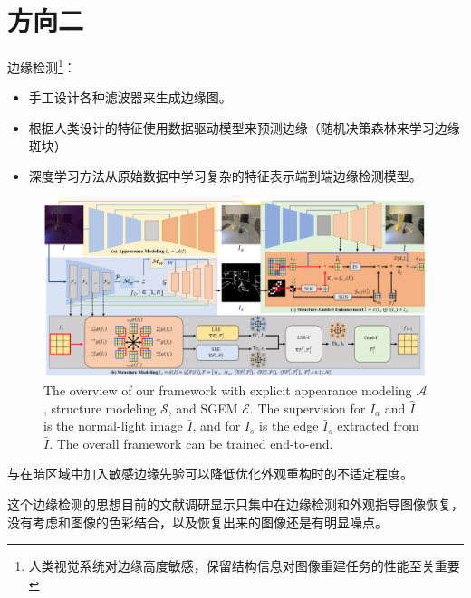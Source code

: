\documentclass[letterpaper,10pt]{article}
\begin{document}
	\section{方向二}
	
		边缘检测\footnote{人类视觉系统对边缘高度敏感，保留结构信息对图像重建任务的性能至关重要}：
		
		\begin{itemize}
			\item[(1)] 
			手工设计各种滤波器来生成边缘图。
			
			\item[(2)]
			根据人类设计的特征使用数据驱动模型来预测边缘（随机决策森林来学习边缘斑块）
			
			\item[(3)]
			深度学习方法从原始数据中学习复杂的特征表示端到端边缘检测模型。
		\end{itemize}	
	
		\begin{figure}[htbp]
			\centering 
			\includegraphics[width=\columnwidth]{picture/LLIE/Overview}
			\caption{
				\label{fig: Overview} 
				The overview of our framework with explicit appearance modeling $\mathcal{A}$, structure modeling $\mathcal{S}$, and SGEM $\mathcal{E}$. The supervision for $I_a$ and $\widehat{I}$ is the normal-light image $\bar{I}$, and for $I_s$ is the edge $\bar{I}_s$ extracted from $\bar{I}$. The overall framework can be trained end-to-end.
			}
		\end{figure}
		
		\cite{rana2021edge}与\cite{zhu2020eemefn}在暗区域中加入敏感边缘先验可以降低优化外观重构时的不适定程度。

		这个边缘检测的思想目前的文献调研显示只集中在边缘检测和外观指导图像恢复，没有考虑和图像的色彩结合，以及恢复出来的图像还是有明显噪点。
\end{document}
